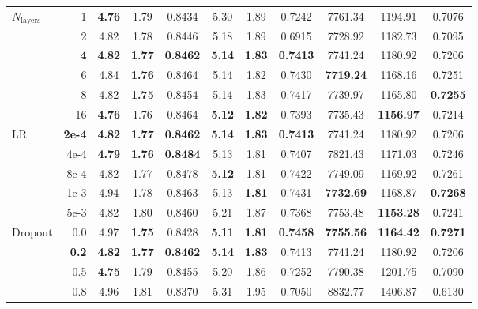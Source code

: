 \begin{longtable}{@{} l r  ccc  ccc  ccc @{}}
\multirow{6}{*}{$N_\mathrm{layers}$}
  & 1            & \textbf{4.76} & 1.79 & 0.8434 & 5.30 & 1.89 & 0.7242 & 7761.34 & 1194.91 & 0.7076 \\
  & 2            & 4.82 & 1.78 & 0.8446 & 5.18 & 1.89 & 0.6915 & 7728.92 & 1182.73 & 0.7095 \\
  & \textbf{4}   & \textbf{4.82} & \textbf{1.77} & \textbf{0.8462} & \textbf{5.14} & \textbf{1.83} & \textbf{0.7413} & 7741.24 & 1180.92 & 0.7206 \\
  & 6            & 4.84 & \textbf{1.76} & 0.8464 & 5.14 & 1.82 & 0.7430 & \textbf{7719.24} & 1168.16 & 0.7251 \\
  & 8            & 4.82 & \textbf{1.75} & 0.8454 & 5.14 & 1.83 & 0.7417 & 7739.97 & 1165.80 & \textbf{0.7255} \\
  & 16           & \textbf{4.76} & 1.76 & 0.8464 & \textbf{5.12} & \textbf{1.82} & 0.7393 & 7735.43 & \textbf{1156.97} & 0.7214 \\
\midrule[0.4pt]

\multirow{5}{*}{LR}
  & \textbf{2e-4} & \textbf{4.82} & \textbf{1.77} & \textbf{0.8462} & \textbf{5.14} & \textbf{1.83} & \textbf{0.7413} & 7741.24 & 1180.92 & 0.7206 \\
  & 4e-4          & \textbf{4.79} & \textbf{1.76} & \textbf{0.8484} & 5.13 & 1.81 & 0.7407 & 7821.43 & 1171.03 & 0.7246 \\
  & 8e-4          & 4.82 & 1.77 & 0.8478 & \textbf{5.12} & 1.81 & 0.7422 & 7749.09 & 1169.92 & 0.7261 \\
  & 1e-3          & 4.94 & 1.78 & 0.8463 & 5.13 & \textbf{1.81} & 0.7431 & \textbf{7732.69} & 1168.87 & \textbf{0.7268} \\
  & 5e-3          & 4.82 & 1.80 & 0.8460 & 5.21 & 1.87 & 0.7368 & 7753.48 & \textbf{1153.28} & 0.7241 \\
\midrule[0.4pt]

\multirow{4}{*}{Dropout}
  & 0.0          & 4.97 & \textbf{1.75} & 0.8428 & \textbf{5.11} & \textbf{1.81} & \textbf{0.7458} & \textbf{7755.56} & \textbf{1164.42} & \textbf{0.7271} \\
  & \textbf{0.2} & \textbf{4.82} & \textbf{1.77} & \textbf{0.8462} & \textbf{5.14} & \textbf{1.83} & 0.7413 & 7741.24 & 1180.92 & 0.7206 \\
  & 0.5          & \textbf{4.75} & 1.79 & 0.8455 & 5.20 & 1.86 & 0.7252 & 7790.38 & 1201.75 & 0.7090 \\
  & 0.8          & 4.96 & 1.81 & 0.8370 & 5.31 & 1.95 & 0.7050 & 8832.77 & 1406.87 & 0.6130 \\
\midrule[0.4pt]


\end{longtable}
